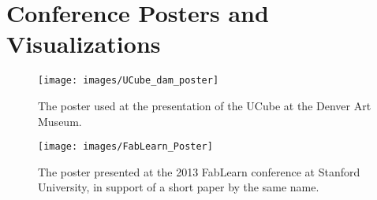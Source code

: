 \chapter{Conference Posters and Visualizations}	%


\begin{figure}[!ht]
\begin{center}
\texttt{[image: images/UCube\_dam\_poster]}
\end{center}
\caption{The poster used at the presentation of the UCube at the Denver Art
Museum.}
\label{dam}
\end{figure}



\begin{figure}[!ht]
\begin{center}
\texttt{[image: images/FabLearn\_Poster]}
\end{center}
\caption{The poster presented at the 2013 FabLearn conference at Stanford
University, in support of a short paper by the same name\cite{leducembodied}.}
\label{fablearn}
\end{figure}






